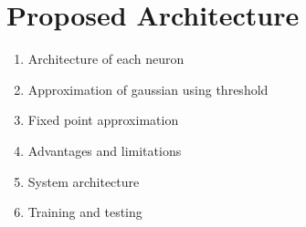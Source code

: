 \section{Proposed Architecture}
\label{sec_arch}

\begin{enumerate}
\item Architecture of each neuron
\item Approximation of gaussian using threshold
\item Fixed point approximation
\item Advantages and limitations
\item System architecture
\item Training and testing
\end{enumerate}